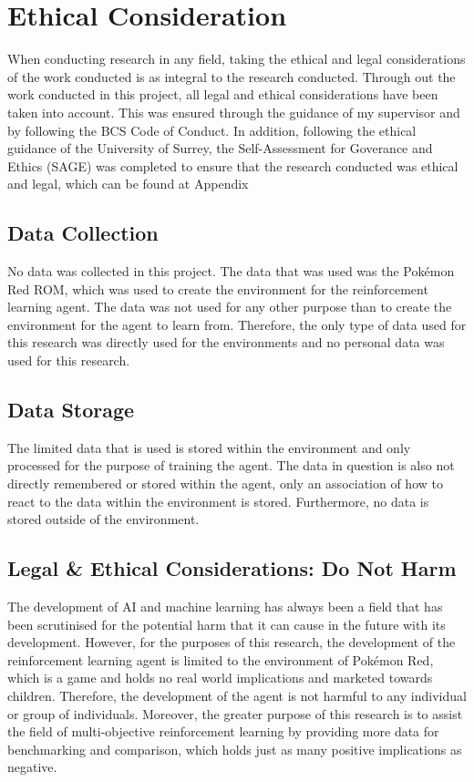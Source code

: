 \section{Ethical Consideration}

When conducting research in any field, taking the ethical and legal considerations of the work conducted is as integral to the research conducted. Through out the work conducted in this project, all legal and ethical considerations have been taken into account. This was ensured through the guidance of my supervisor and by following the BCS Code of Conduct. In addition, following the ethical guidance of the University of Surrey, the Self-Assessment for Goverance and Ethics (SAGE) was completed to ensure that the research conducted was ethical and legal, which can be found at Appendix %

\subsection{Data Collection}

No data was collected in this project. The data that was used was the Pokémon Red ROM, which was used to create the environment for the reinforcement learning agent. The data was not used for any other purpose than to create the environment for the agent to learn from. Therefore, the only type of data used for this research was directly used for the environments and no personal data was used for this research.

\subsection{Data Storage}

The limited data that is used is stored within the environment and only processed for the purpose of training the agent. The data in question is also not directly remembered or stored within the agent, only an association of how to react to the data within the environment is stored. Furthermore, no data is stored outside of the environment. 

\subsection{Legal \& Ethical Considerations: Do Not Harm}

The development of AI and machine learning has always been a field that has been scrutinised for the potential harm that it can cause in the future with its development. However, for the purposes of this research, the development of the reinforcement learning agent is limited to the environment of Pokémon Red, which is a game and holds no real world implications and marketed towards children. Therefore, the development of the agent is not harmful to any individual or group of individuals. Moreover, the greater purpose of this research is to assist the field of multi-objective reinforcement learning by providing more data for benchmarking and comparison, which holds just as many positive implications as negative.

